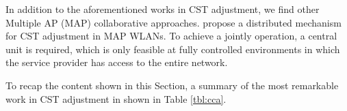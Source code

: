 \documentclass[12pt, a4paper,twoside]{tesi_upf}
\begin{document}
				In addition to the aforementioned works in CST adjustment, we find other Multiple AP (MAP) collaborative approaches. \cite{hua2009cooperative, hua2009distributed} propose a distributed mechanism for CST adjustment in MAP WLANs. To achieve a jointly operation, a central unit is required, which is only feasible at fully controlled environments in which the service provider has access to the entire network.
			
			To recap the content shown in this Section, a summary of the most remarkable work in CST adjustment in shown in Table \ref{tbl:cca}.			
			\begin{table}[h!]
				\centering
\end{table}
\end{document}
